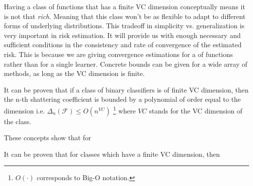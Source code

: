 Having a class of functions that has a finite VC dimension conceptually means it is not that \textit{rich}. Meaning that this class won't be as flexible to adapt to different forms of underlying distributions. This tradeoff in simplicity vs. generalization is very important in risk estimation. It will provide us with enough necessary and sufficient conditions in the consistency and rate of convergence of the estimated risk. This is because we are giving convergence estimations for a  of functions rather than for a single learner. Concrete bounds can be given for a wide array of methods, as long as the VC dimension is finite.

It can be proven that if a class of binary classifiers is of finite VC dimension, then the n-th shattering coefficient is bounded by a polynomial of order equal to the dimension 
i.e. $\Delta_n(\mathcal {F}) \leq O(n^{VC})$ \footnote{$O(\cdot)$ corresponds to Big-O notation.} where $VC$ stands for the VC dimension of the class.

These concepts show that for

It can be proven that for classes which have a finite VC dimension, then

